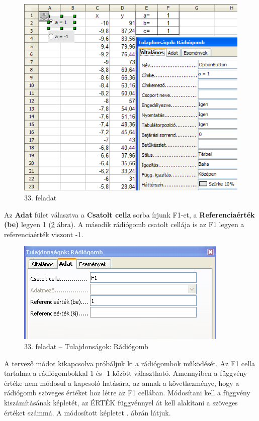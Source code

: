 \begin{figure}[!h]
\begin{center}
\includegraphics[width=12.016cm]{oocalcv2-img152.png}
\caption{33. feladat}\label{33-feladat}
\end{center}
\end{figure}

Az \textbf{Adat} fület választva a \textbf{Csatolt cella} sorba
írjunk F1-et, a \textbf{Referenciaérték (be)} legyen 1 (\ref{33-feladatRádiógomb}
ábra). A második rádiógomb csatolt cellája is az F1 legyen a
referenciaérték viszont -1.

\begin{figure}[!h]
\begin{center}
\includegraphics[width=10.081cm]{oocalcv2-img153.png}
\caption{33. feladat --  Tulajdonságok: Rádiógomb}\label{33-feladatRádiógomb}
\end{center}
\end{figure}

A tervező módot kikapcsolva próbáljuk ki a rádiógombok
működését. Az F1 cella tartalma a rádiógombokkal 1 és
-1 között választható. Amennyiben a függvény értéke nem
módosul a kapcsoló hatására, az annak a következménye, hogy
a rádiógomb szöveges értéket hoz létre az F1
cellában. Módosítani kell a függvény kiszámításának
képletét, az ÉRTÉK függvénnyel át kell alakítani a
szöveges értéket számmá. A módosított képletet .
ábrán látjuk.

